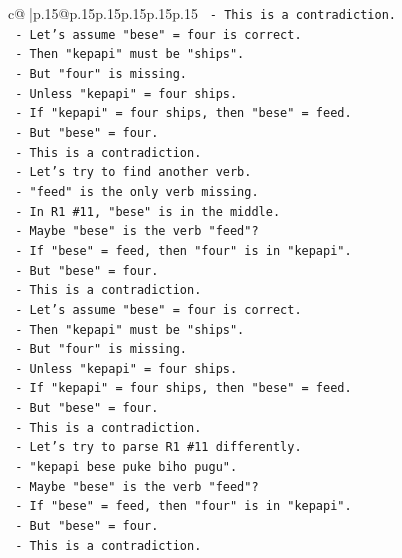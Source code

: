 \documentclass{article}
\begin{document}
{\begin{supertabular}{c@{$\;$}|p{.15\linewidth}@{}p{.15\linewidth}p{.15\linewidth}p{.15\linewidth}p{.15\linewidth}p{.15\linewidth}}
{{{\texttt{        {-} This is a contradiction.} \\
\texttt{        {-} Let's assume "bese" = four is correct.} \\
\texttt{        {-} Then "kepapi" must be "ships".} \\
\texttt{        {-} But "four" is missing.} \\
\texttt{        {-} Unless "kepapi" = four ships.} \\
\texttt{        {-} If "kepapi" = four ships, then "bese" = feed.} \\
\texttt{        {-} But "bese" = four.} \\
\texttt{        {-} This is a contradiction.} \\
\texttt{        {-} Let's try to find another verb.} \\
\texttt{        {-} "feed" is the only verb missing.} \\
\texttt{        {-} In R1 \#11, "bese" is in the middle.} \\
\texttt{        {-} Maybe "bese" is the verb "feed"?} \\
\texttt{        {-} If "bese" = feed, then "four" is in "kepapi".} \\
\texttt{        {-} But "bese" = four.} \\
\texttt{        {-} This is a contradiction.} \\
\texttt{        {-} Let's assume "bese" = four is correct.} \\
\texttt{        {-} Then "kepapi" must be "ships".} \\
\texttt{        {-} But "four" is missing.} \\
\texttt{        {-} Unless "kepapi" = four ships.} \\
\texttt{        {-} If "kepapi" = four ships, then "bese" = feed.} \\
\texttt{        {-} But "bese" = four.} \\
\texttt{        {-} This is a contradiction.} \\
\texttt{        {-} Let's try to parse R1 \#11 differently.} \\
\texttt{        {-} "kepapi bese puke biho pugu".} \\
\texttt{        {-} Maybe "bese" is the verb "feed"?} \\
\texttt{        {-} If "bese" = feed, then "four" is in "kepapi".} \\
\texttt{        {-} But "bese" = four.} \\
\texttt{        {-} This is a contradiction.} \\
}}}
\end{supertabular}}
\end{document}
